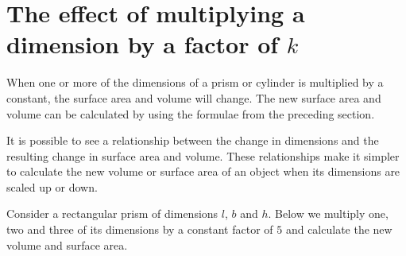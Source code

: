 \section{The effect of multiplying a dimension by a factor of $k$}
When one or more of the dimensions of a prism or cylinder is multiplied by a constant, the
surface area and volume will change. The new surface area and volume can be calculated by
using the formulae from the preceding section.\par
It is possible to see a relationship between the change in dimensions and the resulting change
in surface area and volume. These relationships make it simpler to
calculate the new volume or surface area of an object when its dimensions are
scaled up or down.\par
{}
Consider a rectangular prism of dimensions $l$, $b$ and $h$. Below we multiply one, two and
three of its dimensions by a constant factor of $5$ and calculate the new volume and surface area.\par
